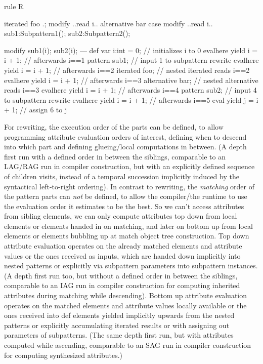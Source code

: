 \begin{example}
  \begin{grgen}
rule R {
  iterated foo { .; modify { ..read i.. } }
  alternative bar { case { modify { ..read i.. } } } 
  sub1:Subpattern1();
  sub2:Subpattern2();

  modify {
    sub1(i);
    sub2(i);
  ---
    def var i:int = 0; // initializes i to 0
    evalhere { yield i = i + 1; } // afterwards i==1
    pattern sub1; // input 1 to subpattern rewrite
    evalhere { yield i = i + 1; } // afterwards i==2
    iterated foo; // nested iterated reads i==2 
    evalhere { yield i = i + 1; } // afterwards i==3
    alternative bar; // nested alternative reads i==3
    evalhere { yield i = i + 1; } // afterwards i==4
    pattern sub2; // input 4 to subpattern rewrite
    evalhere { yield i = i + 1; } // afterwards i==5
    eval { yield j = i + 1; } // assign 6 to j
  }
}
  \end{grgen}
\end{example}

\begin{note}
For rewriting, the execution order of the parts can be defined, to allow programming attribute evaluation orders of interest, defining when to descend into which part and defining glueing/local computations in between.
(A depth first run with a defined order in between the siblings, comparable to an LAG/RAG run in compiler construction, but with an explicitly defined sequence of children visits, instead of a temporal succession implicitly induced by the syntactical left-to-right ordering).
In contrast to rewriting, the \emph{matching} order of the pattern parts can \emph{not} be defined, to allow the compiler/the runtime to use the evaluation order it estimates to be the best.
So we can't access attributes from sibling elements, we can only compute attributes top down from local elements or elements handed in on matching, and later on bottom up from local elements or elements bubbling up at match object tree construction.
Top down attribute evaluation operates on the already matched elements and attribute values or the ones received as inputs, which are handed down implicitly into nested patterns or explicitly via subpattern parameters into subpattern instances. (A depth first run too, but without a defined order in between the siblings, comparable to an IAG run in compiler construction for computing inherited attributes during matching while descending).
Bottom up attribute evaluation operates on the matched elements and attribute values locally available or the ones received into def elements yielded implicitly upwards from the nested patterns or explicitly accumulating iterated results or with assigning out parameters of subpatterns. (The same depth first run, but with attributes computed while ascending, comparable to an SAG run in compiler construction for computing synthesized attributes.)
\end{note}

